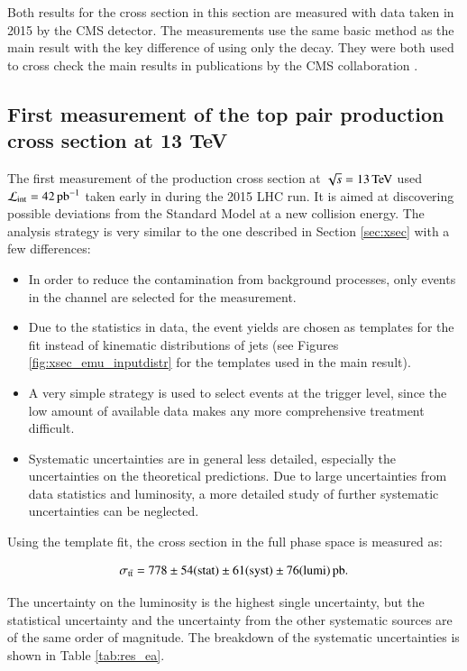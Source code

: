 Both results for the \ttbar cross section in this section are measured with data taken in 2015 by the CMS detector.
The measurements use the same basic method as the main result with the key difference of using only the \emu decay.
They were both used to cross check the main results in publications by the CMS collaboration \cite{Khachatryan:2015uqb,Khachatryan:2016kzg}.

\subsection{First measurement of the top pair production cross section at 13 TeV}
\label{sec:res_ea}

The first measurement of the \ttbar production cross section at $\sqrt{s}= 13 \,\text{Te\hspace{-.08em}V}$ used $\mathcal{L}_{\mathrm{int}}= 42 \mbox{\ensuremath{\,\text{pb}^\text{$-$1}}}$ taken early in during the 2015 LHC run.
It is aimed at discovering possible deviations from the Standard Model at a new collision energy.
The analysis strategy is very similar to the one described in Section \ref{sec:xsec} with a few differences: 

\begin{itemize}
\item In order to reduce the contamination from background processes, only events in the \emu channel are selected for the measurement.
\item Due to the statistics in data, the event yields are chosen as templates for the fit instead of kinematic distributions of jets (see Figures \ref{fig:xsec_emu_inputdistr} for the templates used in the main result).
\item A very simple strategy is used to select events at the trigger level, since the low amount of available data makes any more comprehensive treatment difficult.
\item Systematic uncertainties are in general less detailed, especially the uncertainties on the theoretical predictions. Due to large uncertainties
from data statistics and luminosity, a more detailed study of further systematic uncertainties can be neglected.
\end{itemize}

Using the template fit, the \ttbar cross section in the full phase space is measured as:

\begin{equation}
\sigma_{\mathrm{t}\bar{\mathrm{t}}} = 778 \pm  54 ({\rm stat}) \pm 61 ({\rm syst}) \pm 76 ({\rm lumi}) \mbox{\ensuremath{\,\text{pb}}}.
\end{equation}

The uncertainty on the luminosity is the highest single uncertainty, but the statistical uncertainty and the uncertainty from the other systematic sources are of the same order of magnitude.
The breakdown of the systematic uncertainties is shown in Table \ref{tab:res_ea}.

